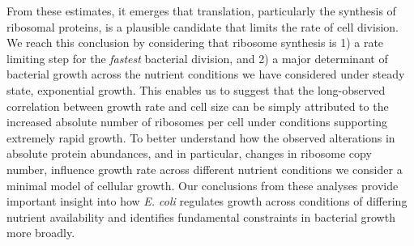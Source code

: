 From these estimates, it emerges that translation, particularly the synthesis of
ribosomal proteins, is a plausible candidate that limits the rate of cell
division. We reach this conclusion by considering that ribosome synthesis is 1)
a rate limiting step for the \textit{fastest} bacterial division, and 2) a major
determinant of bacterial growth across the nutrient conditions we have
considered under steady state, exponential growth. This enables us to suggest
that the long-observed correlation between growth rate and cell size
\citep{schaechter1958, si2017} can be simply attributed to the increased
absolute number of ribosomes per cell under conditions supporting extremely
rapid growth. To better understand how the observed alterations in absolute
protein abundances, and in particular, changes in ribosome copy number,
influence growth rate across different nutrient conditions we consider a minimal
model of cellular growth. Our conclusions from these analyses provide important
insight into how \textit{E. coli} regulates growth across conditions of
differing nutrient availability and identifies fundamental constraints in
bacterial growth more broadly.

\begin{figure}
\end{figure}
